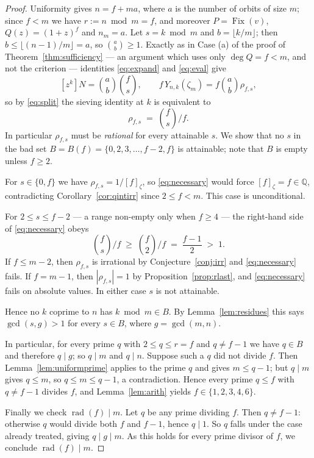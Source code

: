 \documentclass[11pt,a4paper]{article}
\theoremstyle{plain}
\theoremstyle{definition}
\theoremstyle{remark}
\newcommand{\Q}{\mathbb{Q}}
\newcommand{\Fix}{\operatorname{Fix}}
\newcommand{\rad}{\operatorname{rad}}
\begin{document}
\begin{proof}
Uniformity gives $n=f+ma$, where $a$ is the number of orbits of size $m$; since $f<m$ we
have $r:=n\bmod m=f$, and moreover $P=\Fix(v)$, $Q(z)=(1+z)^{f}$ and $n_m=a$. Let
$s=k\bmod m$ and $b=\lfloor k/m\rfloor$; then $b\le\lfloor(n-1)/m\rfloor=a$, so
$\binom{a}{b}\ge1$. Exactly as in Case (a) of the proof of Theorem~\ref{thm:sufficiency} ---
an argument which uses only $\deg Q=f<m$, and not the criterion --- identities
\eqref{eq:expand} and \eqref{eq:eval} give
\[
  [z^k]N=\binom{a}{b}\binom{f}{s},
  \qquad
  f\,Y_{n,k}(\zeta_m)=f\binom{a}{b}\rho_{f,s},
\]
so by \eqref{eq:split} the sieving identity at $k$ is equivalent to
\begin{equation}\label{eq:necessary}
  \rho_{f,s}\;=\;\binom{f}{s}\Big/f .
\end{equation}
In particular $\rho_{f,s}$ must be \emph{rational} for every attainable $s$. We show that no
$s$ in the bad set $B=B(f)=\{0,2,3,\dots,f-2,f\}$ is attainable; note that $B$ is empty
unless $f\ge2$.

For $s\in\{0,f\}$ we have $\rho_{f,s}=1/[f]_\zeta$, so \eqref{eq:necessary} would force
$[f]_\zeta=f\in\Q$, contradicting Corollary~\ref{cor:qintirr} since $2\le f<m$. This case
is unconditional.

For $2\le s\le f-2$ --- a range non-empty only when $f\ge4$ --- the right-hand side of
\eqref{eq:necessary} obeys
\[
  \binom{f}{s}\Big/f\;\ge\;\binom{f}{2}\Big/f\;=\;\frac{f-1}{2}\;>\;1 .
\]
If $f\le m-2$, then $\rho_{f,s}$ is irrational by Conjecture~\ref{conj:irr} and
\eqref{eq:necessary} fails. If $f=m-1$, then $|\rho_{f,s}|=1$ by
Proposition~\ref{prop:rlast}, and \eqref{eq:necessary} fails on absolute values. In either
case $s$ is not attainable.

Hence no $k$ coprime to $n$ has $k\bmod m\in B$. By Lemma~\ref{lem:residues} this says
$\gcd(s,g)>1$ for every $s\in B$, where $g=\gcd(m,n)$.

In particular, for every prime $q$ with $2\le q\le r=f$ and $q\ne f-1$ we have $q\in B$ and
therefore $q\mid g$; so $q\mid m$ and $q\mid n$. Suppose such a $q$ did not divide $f$. Then
Lemma~\ref{lem:uniformprime} applies to the prime $q$ and gives $m\le q-1$; but $q\mid m$
gives $q\le m$, so $q\le m\le q-1$, a contradiction. Hence every prime $q\le f$ with
$q\ne f-1$ divides $f$, and Lemma~\ref{lem:arith} yields $f\in\{1,2,3,4,6\}$.

Finally we check $\rad(f)\mid m$. Let $q$ be any prime dividing $f$. Then $q\ne f-1$:
otherwise $q$ would divide both $f$ and $f-1$, hence $q\mid1$. So $q$ falls under the case
already treated, giving $q\mid g\mid m$. As this holds for every prime divisor of $f$, we
conclude $\rad(f)\mid m$.
\end{proof}
\end{document}
